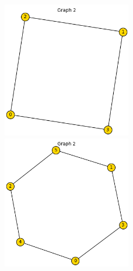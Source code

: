 \documentclass{article}
\begin{document}
\begin{figure}[h]
    \centering
    \includegraphics[width=0.5\textwidth]{izjema1.png}
    \includegraphics[width=0.5\textwidth]{izjema2.png}
   
\end{figure}
\end{document}
